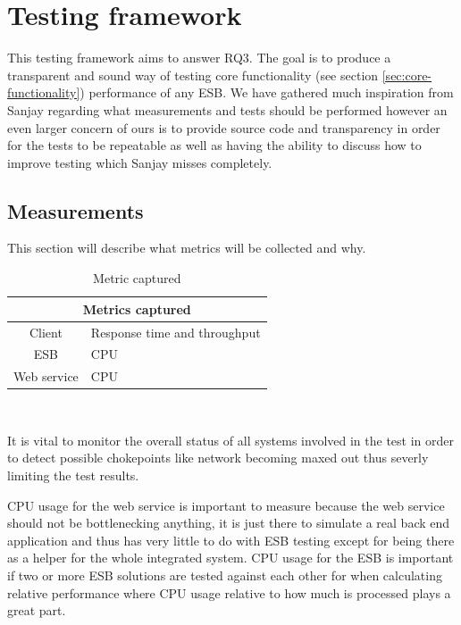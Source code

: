 \section{Testing framework}
This testing framework aims to answer RQ3. The goal is to produce a transparent and sound way of testing core functionality (see section \ref{sec:core-functionality}) performance of any ESB. 
We have gathered much inspiration from Sanjay \cite{Sanjay2011} regarding what measurements and tests should be performed however an even larger concern of ours is to provide source code and transparency in order for the tests to be repeatable as well as having the ability to discuss how to improve testing which Sanjay misses completely.

\subsection{Measurements}
\label{sec:measurements}
This section will describe what metrics will be collected and why.\\

\begin{table}[H]
	\caption{Metric captured}
	\begin{tabular}{c l}
		\multicolumn{2}{c}{Metrics captured} \\
		\hline
		Client & Response time and throughput \\
		ESB & CPU \\ 
		Web service &  CPU \\
		\hline
	\end{tabular} \\
\end{table}

It is vital to monitor the overall status of all systems involved in the test in order to detect possible chokepoints like network becoming maxed out thus severly limiting the test results.

CPU usage for the web service is important to measure because the web service should not be bottlenecking anything, it is just there to simulate a real back end application and thus has very little to do with ESB testing except for being there as a helper for the whole integrated system.
CPU usage for the ESB is important if two or more ESB solutions are tested against each other for when calculating relative performance where CPU usage relative to how much is processed plays a great part.


